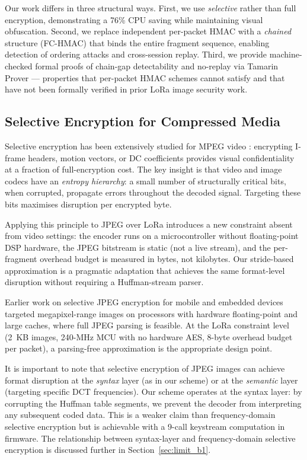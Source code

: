 \documentclass[journal]{IEEEtran}
\begin{document}
Our work differs in three structural ways.  First, we use \emph{selective}
rather than full encryption, demonstrating a 76\% CPU saving while maintaining
visual obfuscation.  Second, we replace independent per-packet HMAC with a
\emph{chained} structure (FC-HMAC) that binds the entire fragment sequence,
enabling detection of ordering attacks and cross-session replay.  Third, we
provide machine-checked formal proofs of chain-gap detectability and no-replay
via Tamarin Prover --- properties that per-packet HMAC schemes cannot satisfy
and that have not been formally verified in prior LoRa image security work.

\subsection{Selective Encryption for Compressed Media}

Selective encryption has been extensively studied for MPEG video
\cite{rfc3610}: encrypting I-frame headers, motion vectors, or DC coefficients
provides visual confidentiality at a fraction of full-encryption cost.  The
key insight is that video and image codecs have an \emph{entropy hierarchy}:
a small number of structurally critical bits, when corrupted, propagate errors
throughout the decoded signal.  Targeting these bits maximises disruption per
encrypted byte.

Applying this principle to JPEG over LoRa introduces a new constraint absent
from video settings: the encoder runs on a microcontroller without floating-point
DSP hardware, the JPEG bitstream is static (not a live stream), and the
per-fragment overhead budget is measured in bytes, not kilobytes.  Our
stride-based approximation is a pragmatic adaptation that achieves the same
format-level disruption without requiring a Huffman-stream parser.

Earlier work on selective JPEG encryption for mobile and embedded devices
targeted megapixel-range images on processors with hardware floating-point and
large caches, where full JPEG parsing is feasible.  At the LoRa constraint
level (2~KB images, 240-MHz MCU with no hardware AES, 8-byte overhead budget per
packet), a parsing-free approximation is the appropriate design point.

It is important to note that selective encryption of JPEG images can achieve
format disruption at the \emph{syntax} layer (as in our scheme) or at the
\emph{semantic} layer (targeting specific DCT frequencies).  Our scheme operates
at the syntax layer: by corrupting the Huffman table segments, we prevent the
decoder from interpreting any subsequent coded data.  This is a weaker claim
than frequency-domain selective encryption but is achievable with a 9-call
keystream computation in firmware.  The relationship between syntax-layer and
frequency-domain selective encryption is discussed further in
Section~\ref{sec:limit_b1}.
\end{document}
